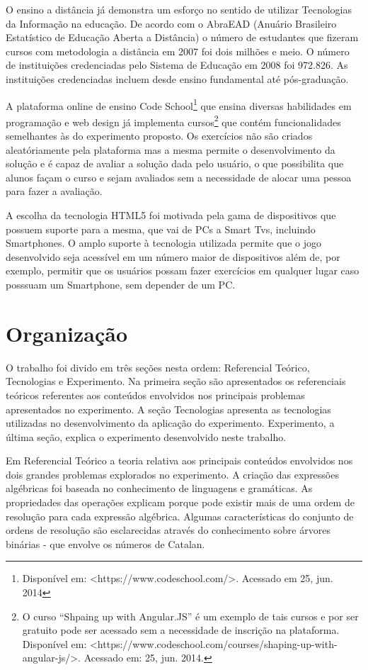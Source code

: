 	O ensino a distância já demonstra um esforço no sentido de utilizar Tecnologias da Informação na educação. De acordo com o AbraEAD (Anuário Brasileiro Estatístico de Educação Aberta a Distância) o número de estudantes que fizeram cursos com metodologia a distância em 2007 foi dois milhões e meio. O número de instituições credenciadas pelo Sistema de Educação em 2008 foi 972.826. As instituições credenciadas incluem desde ensino fundamental até pós-graduação. \cite{eadBr}

	A plataforma online de ensino Code School\footnote{Disponível em: <https://www.codeschool.com/>. Acessado em 25, jun. 2014} que ensina diversas habilidades em programação e web design já implementa cursos\footnote{O curso “Shpaing up with Angular.JS” é um exemplo de tais cursos e por ser gratuito pode ser acessado sem a necessidade de inscrição na plataforma. Disponível em: <https://www.codeschool.com/courses/shaping-up-with-angular-js/>. Acessado em: 25, jun. 2014.} que contém funcionalidades semelhantes às do experimento proposto. Os exercícios não são criados aleatóriamente pela plataforma mas a mesma permite o desenvolvimento da solução e é capaz de avaliar a solução dada pelo usuário, o que possibilita que alunos façam o curso e sejam avaliados sem a necessidade de alocar uma pessoa para fazer a avaliação.
	
	A escolha da tecnologia HTML5 foi motivada pela gama de dispositivos que possuem suporte para a mesma, que vai de PCs a Smart Tvs, incluindo Smartphones. O amplo suporte à tecnologia utilizada permite que o jogo desenvolvido seja acessível em um número maior de dispositivos além de, por exemplo, permitir que os usuários possam fazer exercícios em qualquer lugar caso posssuam um Smartphone, sem depender de um PC.
	
\section{Organização}
O trabalho foi divido em três seções nesta ordem: Referencial Teórico, Tecnologias e Experimento. Na primeira seção são apresentados os referenciais teóricos referentes aos conteúdos envolvidos nos principais problemas apresentados no experimento. A seção Tecnologias apresenta as tecnologias utilizadas no desenvolvimento da aplicação do experimento. Experimento, a última seção, explica o experimento desenvolvido neste trabalho. 

Em Referencial Teórico a teoria relativa aos principais conteúdos envolvidos nos dois grandes problemas explorados no experimento. A criação das expressões algébricas foi baseada no conhecimento de linguagens e gramáticas. As propriedades das operações explicam porque pode existir mais de uma ordem de resolução para cada expressão algébrica. Algumas características do conjunto de ordens de resolução são esclarecidas através do conhecimento sobre árvores binárias - que envolve os números de Catalan.

